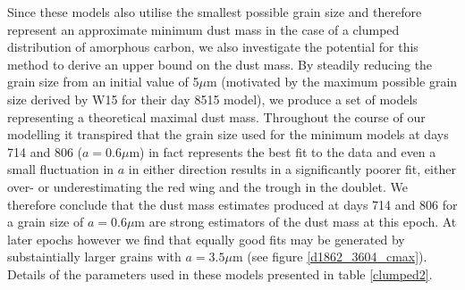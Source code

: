 \documentclass[useAMS,usenatbib,usegraphicx]{mnras}
\begin{document}
Since these models also utilise the smallest possible grain size and therefore represent an approximate minimum dust mass in the case of a clumped distribution of amorphous carbon, we also investigate the potential for this method to derive an upper bound on the dust mass.  By steadily reducing the grain size from an initial value of 5$\mu$m (motivated by the maximum possible grain size derived by W15 for their day 8515 model), we produce a set of models representing a theoretical maximal dust mass.  Throughout the course of our modelling it transpired that the grain size used for the minimum models at days 714 and 806 ($a=0.6\mu$m) in fact represents the best fit to the data and even a small fluctuation in $a$ in either direction results in a significantly poorer fit, either over- or underestimating the red wing and the trough in the doublet.  We therefore conclude that the dust mass estimates produced at days 714 and 806 for a grain size of $a=0.6\mu$m are strong estimators of the dust mass at this epoch.  At later epochs however we find that equally good fits may be generated by substaintially larger grains with $a=3.5\mu$m (see figure \ref{d1862_3604_cmax}).  Details of the parameters used in these models presented in table \ref{clumped2}. 
\end{document}
